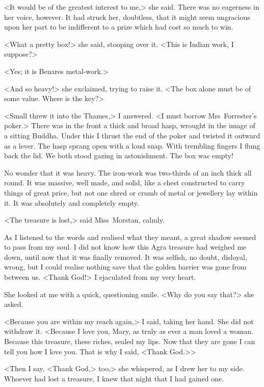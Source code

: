 <It would be of the greatest interest to me,> she said. There was no eagerness in her voice, however. It had struck her, doubtless, that it might seem ungracious upon her part to be indifferent to a prize which had cost so much to win.

<What a pretty box!> she said, stooping over it. <This is Indian work, I suppose?>

<Yes; it is Benares metal-work.>

<And so heavy!> she exclaimed, trying to raise it. <The box alone must be of some value. Where is the key?>

<Small threw it into the Thames,> I answered. <I must borrow Mrs~Forrester's poker.> There was in the front a thick and broad hasp, wrought in the image of a sitting Buddha. Under this I thrust the end of the poker and twisted it outward as a lever. The hasp sprang open with a loud snap. With trembling fingers I flung back the lid. We both stood gazing in astonishment. The box was empty!

No wonder that it was heavy. The iron-work was two-thirds of an inch thick all round. It was massive, well made, and solid, like a chest constructed to carry things of great price, but not one shred or crumb of metal or jewellery lay within it. It was absolutely and completely empty.

<The treasure is lost,> said Miss~Morstan, calmly.

As I listened to the words and realised what they meant, a great shadow seemed to pass from my soul. I did not know how this Agra treasure had weighed me down, until now that it was finally removed. It was selfish, no doubt, disloyal, wrong, but I could realise nothing save that the golden barrier was gone from between us. <Thank God!> I ejaculated from my very heart.

She looked at me with a quick, questioning smile. <Why do you say that?> she asked.

<Because you are within my reach again,> I said, taking her hand. She did not withdraw it. <Because I love you, Mary, as truly as ever a man loved a woman. Because this treasure, these riches, sealed my lips. Now that they are gone I can tell you how I love you. That is why I said, <Thank God.>>

<Then I say, <Thank God,> too,> she whispered, as I drew her to my side. Whoever had lost a treasure, I knew that night that I had gained one.